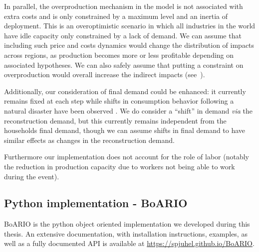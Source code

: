 \documentclass[main.tex]{subfiles}
\begin{document}
In parallel, the overproduction mechanism in the model is not associated with
extra costs and is only constrained by a maximum level and an inertia of
deployment. This is an overoptimistic scenario in which all industries in the
world have idle capacity only constrained by a lack of demand. We can assume
that including such price and costs dynamics would change the distribution of
impacts across regions, as production becomes more or less profitable depending
on associated hypotheses. We can also safely assume that putting a constraint on
overproduction would overall increase the indirect impacts
(see~).

Additionally, our consideration of final demand could be enhanced: it currently
remains fixed at each step while shifts in consumption behavior following a
natural disaster have been observed \parencite{kennett-hensel-2012-limin-consum,
  alatrista-salas-2021-impac-natur}. We do consider a ``shift'' in demand
\emph{via} the reconstruction demand, but this currently remains independent
from the households final demand, though we can assume shifts in final demand to
have similar effects as changes in the reconstruction demand.

Furthermore our implementation does not account for the role of labor (notably
the reduction in production capacity due to workers not being able to work
during the event).

\subsection{Python implementation - BoARIO}
\label{sec:implementation}

BoARIO is the python object oriented implementation we developed during this
thesis. An extensive documentation, with installation instructions, examples, as
well as a fully documented \acrfull{API} is available at
\url{https://spjuhel.github.io/BoARIO}.
\end{document}
